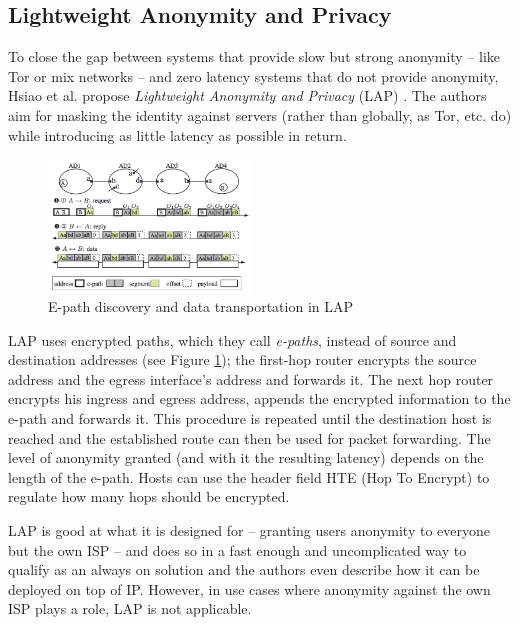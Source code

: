 \documentclass{acm_proc_article-sp}
\begin{document}
\subsection{Lightweight Anonymity and Privacy}
To close the gap between systems that provide slow but strong anonymity -- like Tor or mix networks -- and zero latency systems that do not provide anonymity, Hsiao et al. propose \emph{Lightweight Anonymity and Privacy} (LAP) \cite{lap}. The authors aim for masking the identity against servers (rather than globally, as Tor, etc. do) while introducing as little latency as possible in return. 

\begin{figure}[t]
  \includegraphics[width=0.48\textwidth]{images/epaths.PNG}
  \caption{E-path discovery and data transportation in LAP \cite{lap}}
  \label{fig:lap}
\end{figure}
LAP uses encrypted paths, which they call \emph{e-paths}, instead of source and destination addresses (see Figure \ref{fig:lap}); the first-hop router encrypts the source address and the egress interface's address and forwards it. The next hop router encrypts his ingress and egress address, appends the encrypted information to the e-path and forwards it. This procedure is repeated until the destination host is reached and the established route can then be used for packet forwarding. The level of anonymity granted (and with it the resulting latency) depends on the length of the e-path. Hosts can use the header field HTE (Hop To Encrypt) to regulate how many hops should be encrypted.

LAP is good at what it is designed for -- granting users anonymity to everyone but the own ISP -- and does so in a fast enough and uncomplicated way to qualify as an always on solution and the authors even describe how it can be deployed on top of IP. However, in use cases where anonymity against the own ISP plays a role, LAP is not applicable.

\end{document}
